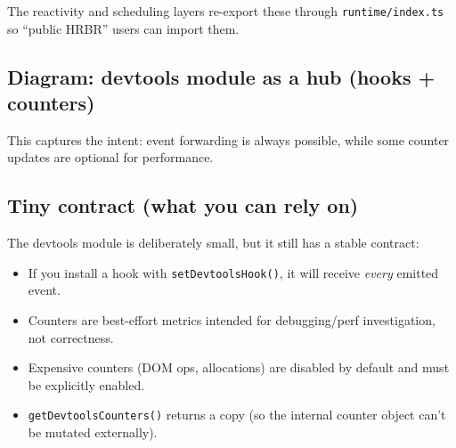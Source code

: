 The reactivity and scheduling layers re-export these through \texttt{runtime/index.ts} so ``public HRBR'' users can import them.

\subsection*{Diagram: devtools module as a hub (hooks + counters)}
\begin{center}
\end{center}

This captures the intent: event forwarding is always possible, while some counter updates are optional for performance.

\subsection{Tiny contract (what you can rely on)}

The devtools module is deliberately small, but it still has a stable contract:

\begin{itemize}
\item If you install a hook with \texttt{setDevtoolsHook()}, it will receive \emph{every} emitted event.
\item Counters are best-effort metrics intended for debugging/perf investigation, not correctness.
\item Expensive counters (DOM ops, allocations) are disabled by default and must be explicitly enabled.
\item \texttt{getDevtoolsCounters()} returns a copy (so the internal counter object can't be mutated externally).
\end{itemize}

